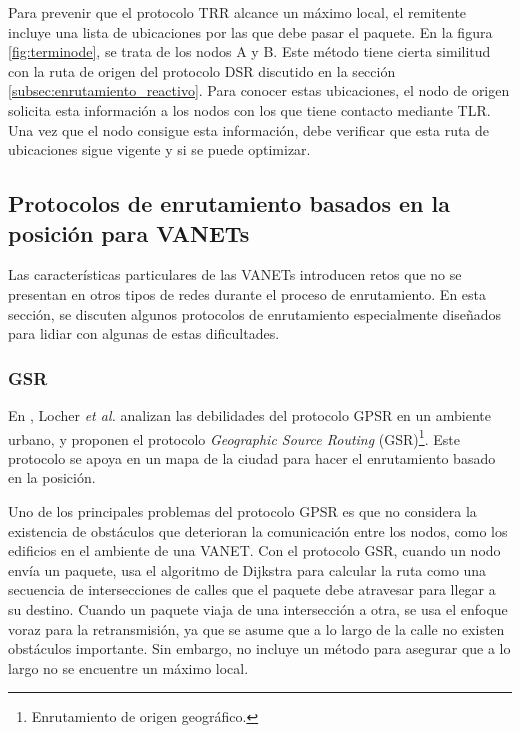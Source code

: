 Para prevenir que el protocolo TRR alcance un máximo local, el remitente incluye
una lista de ubicaciones por las que debe pasar el paquete. En la figura
\ref{fig:terminode}, se trata de los nodos A y B. Este método tiene cierta
similitud con la ruta de origen del protocolo DSR discutido en la sección
\ref{subsec:enrutamiento_reactivo}. Para conocer estas ubicaciones, el nodo
de origen solicita esta información a los nodos con los que tiene contacto
mediante TLR. Una vez que el nodo consigue esta información, debe verificar que
esta ruta de ubicaciones sigue vigente y si se puede optimizar.

\subsection{Protocolos de enrutamiento basados en la posición para VANETs}
\label{subsec:protocolos_de_enrutamiento_basados_en_la_posicion_para_vanets}

Las características particulares de las VANETs introducen retos que no se
presentan en otros tipos de redes durante el proceso de enrutamiento. En esta
sección, se discuten algunos protocolos de enrutamiento especialmente diseñados
para lidiar con algunas de estas dificultades.

\subsubsection{GSR}
\label{subsubsec:gsr}

En \cite{Lochert2003}, Locher \textit{et al.} analizan las debilidades del
protocolo GPSR en un ambiente urbano, y proponen el protocolo
\textit{Geographic Source Routing} (GSR)\footnote{Enrutamiento de origen
geográfico.}. Este protocolo se apoya en un mapa de la ciudad para hacer el
enrutamiento basado en la posición.

Uno de los principales problemas del protocolo GPSR es que no considera la
existencia de obstáculos que deterioran la comunicación entre los nodos, como
los edificios en el ambiente de una VANET. Con el protocolo GSR, cuando un nodo
envía un paquete, usa el algoritmo de Dijkstra para calcular la ruta como una
secuencia de intersecciones de calles que el paquete debe atravesar para llegar
a su destino. Cuando un paquete viaja de una intersección a otra, se usa el
enfoque voraz para la retransmisión, ya que se asume que a lo largo de la calle
no existen obstáculos importante. Sin embargo, no incluye un método para
asegurar que a lo largo no se encuentre un máximo local.

